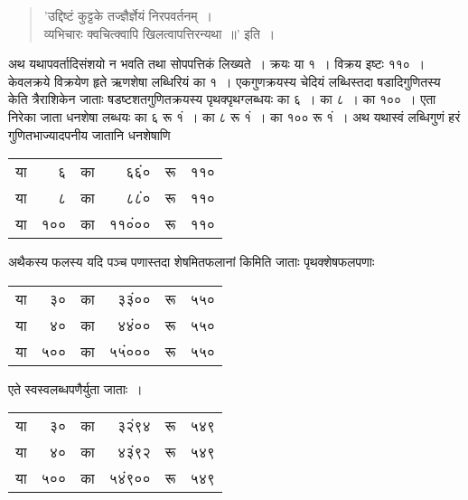 \documentclass[11pt, openany]{book}
\begin{document}
\newpage

\begin{sloppypar}
\begin{quote}
{\color{violet}'उद्दिष्टं कुट्टके तज्ज्ञैर्ज्ञेयं निरपवर्तनम्~।\\
व्यभिचारः क्वचित्क्वापि खिलत्वापत्तिरन्यथा~॥'} इति~।
\end{quote}

अथ यथापवर्तादिसंशयो न भवति तथा सोपपत्तिकं लिख्यते~। क्रयः या १~। विक्रय इष्टः ११०~। केवलक्रये विक्रयेण हृते ऋणशेषा लब्धिरियं का १~। एकगुणक्रयस्य चेदियं लब्धिस्तदा षडादिगुणितस्य केति त्रैराशिकेन जाताः षडष्टशतगुणितक्रयस्य पृथक्पृथग्लब्धयः का ६~। का ८~। का १००~। एता निरेका जाता धनशेषा लब्धयः का ६ रू १ं~। का ८ रू १ं~। का १०० रू १ं~। अथ यथास्वं लब्धिगुणं हरं गुणितभाज्यादपनीय जातानि धनशेषाणि
\vspace{-2mm}

\begin{center}
\begin{tabular}{rrrrrr}
या & ६ & का & ६६ं० & रू & ११०\\
या & ८ & का & ८८ं० & रू & ११०\\
या & १०० & का & ११०ं०० & रू & ११०
\end{tabular}
\end{center}
\vspace{-2mm}

\noindent अथैकस्य फलस्य यदि पञ्च पणास्तदा शेषमितफलानां किमिति जाताः पृथक्शेषफलपणाः
\vspace{-2mm}

\begin{center}
\begin{tabular}{rrrrrr}
या & ३० & का & ३३ं०० & रू & ५५० \\
या & ४० & का & ४४ं०० & रू & ५५० \\
या & ५०० & का & ५५ं००० & रू & ५५०
\end{tabular}
\end{center}
\vspace{-2mm}

एते स्वस्वलब्धपणैर्युता जाताः~।
\vspace{-2mm}

\begin{center}
\begin{tabular}{rrrrrr}
या & ३० & का & ३२ं९४ & रू & ५४९ \\
या & ४० & का & ४३ं९२ & रू & ५४९ \\
या & ५०० & का & ५४ं९०० & रू & ५४९
\end{tabular}
\end{center}
\vspace{-2mm}


\end{sloppypar}
\end{document}
